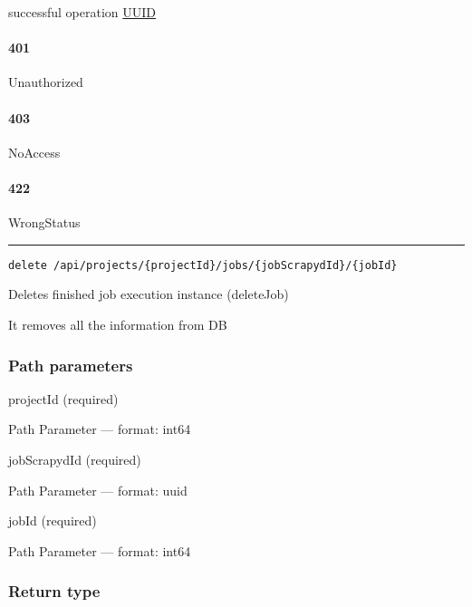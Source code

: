 successful operation \protect\hyperlink{UUID}{UUID}

\hypertarget{section-25}{%
\paragraph{401}\label{section-25}}

Unauthorized \protect\hyperlink{}{}

\hypertarget{section-26}{%
\paragraph{403}\label{section-26}}

NoAccess \protect\hyperlink{}{}

\hypertarget{section-27}{%
\paragraph{422}\label{section-27}}

WrongStatus \protect\hyperlink{}{}

\begin{center}\rule{0.5\linewidth}{0.5pt}\end{center}

\protect\hypertarget{deleteJob}{}{}



\begin{verbatim}
delete /api/projects/{projectId}/jobs/{jobScrapydId}/{jobId}
\end{verbatim}

Deletes finished job execution instance ({deleteJob})

It removes all the information from DB

\hypertarget{path-parameters-6}{%
\subsubsection*{Path parameters}\label{path-parameters-6}}

projectId (required)

{Path Parameter} --- format: int64

jobScrapydId (required)

{Path Parameter} --- format: uuid

jobId (required)

{Path Parameter} --- format: int64

\hypertarget{return-type-8}{%
\subsubsection*{Return type}\label{return-type-8}}

